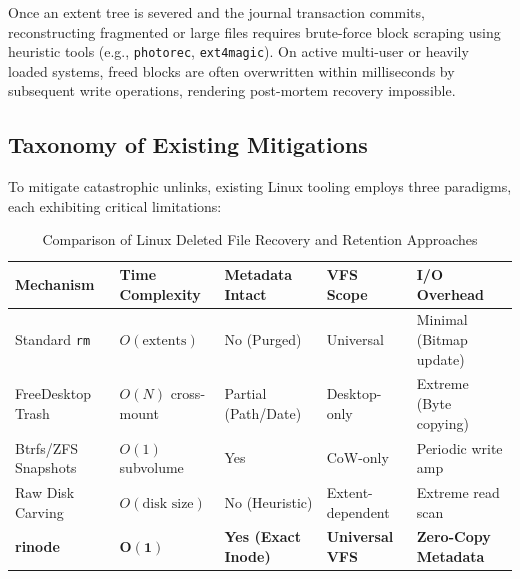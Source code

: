 \documentclass[11pt,a4paper]{article}
\begin{document}
Once an extent tree is severed and the journal transaction commits, reconstructing fragmented or large files requires brute-force block scraping using heuristic tools (e.g., \texttt{photorec}, \texttt{ext4magic}). On active multi-user or heavily loaded systems, freed blocks are often overwritten within milliseconds by subsequent write operations, rendering post-mortem recovery impossible.

\subsection{Taxonomy of Existing Mitigations}
To mitigate catastrophic unlinks, existing Linux tooling employs three paradigms, each exhibiting critical limitations:

\begin{table}[h]
\centering
\small
\caption{Comparison of Linux Deleted File Recovery and Retention Approaches}
\label{tab:comparison}
\begin{tabularx}{\textwidth}{lXXXX}
\toprule
\textbf{Mechanism} & \textbf{Time Complexity} & \textbf{Metadata Intact} & \textbf{VFS Scope} & \textbf{I/O Overhead} \\
\midrule
Standard \texttt{rm} & $O(\text{extents})$ & No (Purged) & Universal & Minimal (Bitmap update) \\
FreeDesktop Trash & $O(N)$ cross-mount & Partial (Path/Date) & Desktop-only & Extreme (Byte copying) \\
Btrfs/ZFS Snapshots & $O(1)$ subvolume & Yes & CoW-only & Periodic write amp \\
Raw Disk Carving & $O(\text{disk size})$ & No (Heuristic) & Extent-dependent & Extreme read scan \\
\textbf{rinode} & $\mathbf{O(1)}$ & \textbf{Yes (Exact Inode)} & \textbf{Universal VFS} & \textbf{Zero-Copy Metadata} \\
\bottomrule
\end{tabularx}
\end{table}
\end{document}
